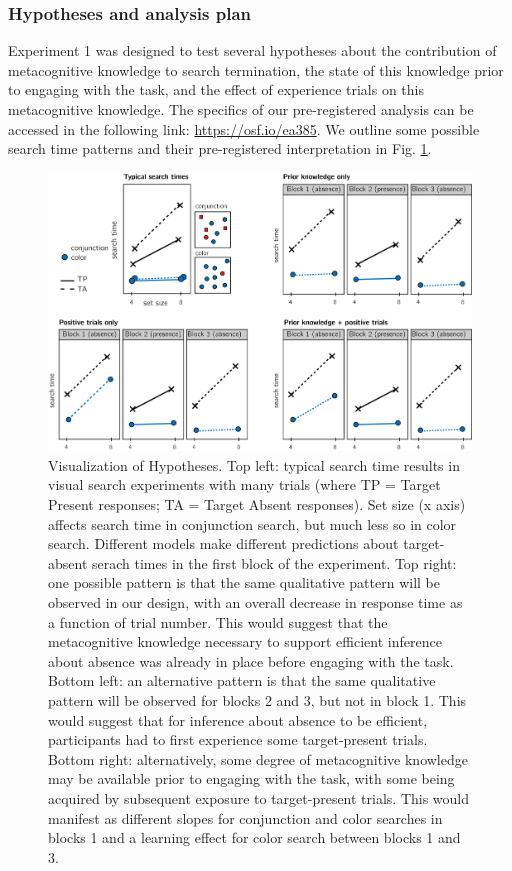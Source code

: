 \documentclass[
  english,
  man]{apa6}
\begin{document}
\hypertarget{hypotheses-and-analysis-plan}{%
\subsubsection{Hypotheses and analysis plan}\label{hypotheses-and-analysis-plan}}

Experiment 1 was designed to test several hypotheses about the contribution of metacognitive knowledge to search termination, the state of this knowledge prior to engaging with the task, and the effect of experience trials on this metacognitive knowledge. The specifics of our pre-registered analysis can be accessed in the following link: \url{https://osf.io/ea385}. We outline some possible search time patterns and their pre-registered interpretation in Fig. \ref{fig:models}.

\begin{figure}[H]
\includegraphics[width=1\linewidth]{figures/models} \caption{Visualization of Hypotheses. Top left: typical search time results in visual search experiments with many trials (where TP =  Target Present responses; TA = Target Absent responses). Set size (x axis) affects search time in conjunction search, but much less so in color search. Different models make different predictions about target-absent serach times in the first block of the experiment. Top right: one possible pattern is that the same qualitative pattern will be observed in our design, with an overall decrease in response time as a function of trial number. This would suggest that the metacognitive knowledge necessary to support efficient inference about absence was already in place before engaging with the task. Bottom left: an alternative pattern is that the same qualitative pattern will be observed for blocks 2 and 3, but not in block 1. This would suggest that for inference about absence to be efficient, participants had to first experience some target-present trials. Bottom right: alternatively, some degree of metacognitive knowledge may be available prior to engaging with the task, with some being acquired by subsequent exposure to target-present trials. This would manifest as different slopes for conjunction and color searches in blocks 1 and a learning effect for color search between blocks 1 and 3.}\label{fig:models}
\end{figure}
\end{document}

